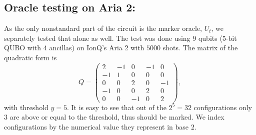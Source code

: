\documentclass[reqno,10pt]{amsart}
\numberwithin{equation}{section}                %
\begin{document}

\subsection{Oracle testing on Aria 2:} As the only nonstandard part of the circuit is the marker oracle, $U_t$, we separately tested that alone as well. The test was done using $9$ qubits ($5$-bit QUBO with $4$ ancillas) on IonQ's Aria 2 with $5000$ shots. The matrix of the quadratic form is
\begin{equation}
   Q = \begin{pmatrix}
         2 & - 1 & 0 & - 1 & 0 \\
         - 1 & 1 & 0 & 0 & 0 \\
         0 & 0 & 2 & 0 & - 1 \\
         - 1 & 0 & 0 & 2 & 0 \\
         0 & 0 & - 1 & 0 & 2
      \end{pmatrix},
\end{equation}
with threshold $y = 5$. It is easy to see that out of the $2^5 = 32$ configurations only $3$ are above or equal to the threshold, thus should be marked. We index configurations by the numerical value they represent in base $2$.
\end{document}
